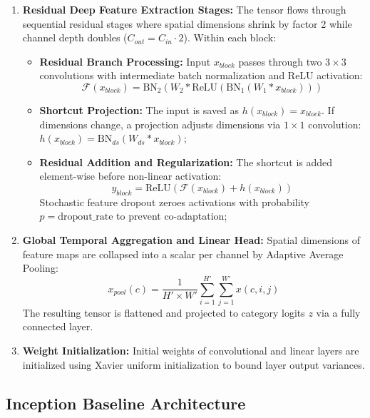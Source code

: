 \begin{enumerate}
    \item \textbf{Residual Deep Feature Extraction Stages:} The tensor flows through sequential residual stages where spatial dimensions shrink by factor 2 while channel depth doubles ($C_{out} = C_{in} \cdot 2$). Within each block:
    \begin{itemize}
        \item \textbf{Residual Branch Processing:} Input $x_{block}$ passes through two $3 \times 3$ convolutions with intermediate batch normalization and ReLU activation:
        \begin{equation}
        \mathcal{F}(x_{block}) = \text{BN}_2(W_2 * \text{ReLU}(\text{BN}_1(W_1 * x_{block})))
        \end{equation}
        \item \textbf{Shortcut Projection:} The input is saved as $h(x_{block}) = x_{block}$. If dimensions change, a projection adjusts dimensions via $1 \times 1$ convolution: $h(x_{block}) = \text{BN}_{ds}(W_{ds} * x_{block})$;
        \item \textbf{Residual Addition and Regularization:} The shortcut is added element-wise before non-linear activation:
        \begin{equation}
        y_{block} = \text{ReLU}(\mathcal{F}(x_{block}) + h(x_{block}))
        \end{equation}
        Stochastic feature dropout zeroes activations with probability $p = \text{dropout\_rate}$ to prevent co-adaptation;
    \end{itemize}
    
    \item \textbf{Global Temporal Aggregation and Linear Head:} Spatial dimensions of feature maps are collapsed into a scalar per channel by Adaptive Average Pooling:
    \begin{equation}
    x_{pool}(c) = \frac{1}{H' \times W'} \sum_{i=1}^{H'} \sum_{j=1}^{W'} x(c, i, j)
    \end{equation}
    The resulting tensor is flattened and projected to category logits $z$ via a fully connected layer.
    
    \item \textbf{Weight Initialization:} Initial weights of convolutional and linear layers are initialized using Xavier uniform initialization to bound layer output variances.
\end{enumerate}

\subsection{Inception Baseline Architecture}

